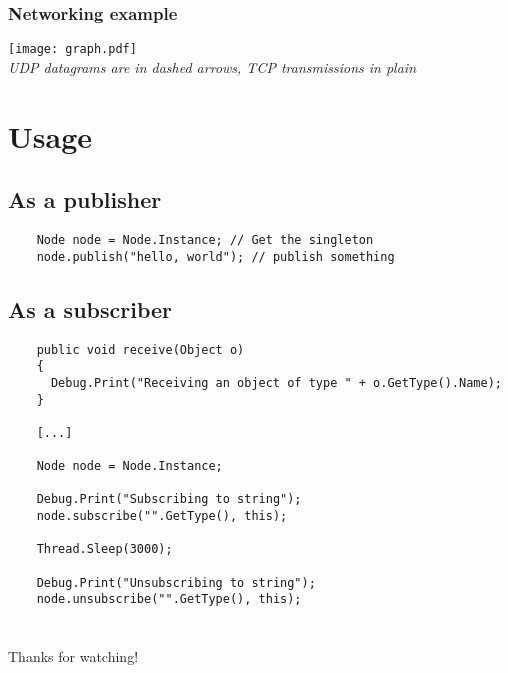 \documentclass{beamer}
\begin{document}
\subsubsection{Networking example}
\begin{frame}
  \begin{center}
    \texttt{[image: graph.pdf]} \\ \vspace{1cm}
    \emph{UDP datagrams are in dashed arrows, TCP transmissions in plain}
  \end{center}
\end{frame}


\section{Usage}
\subsection{As a publisher}
\begin{frame}[fragile]
  \begin{verbatim}
    Node node = Node.Instance; // Get the singleton
    node.publish("hello, world"); // publish something
  \end{verbatim}
\end{frame}

\subsection{As a subscriber}
\begin{frame}[fragile]
  \begin{verbatim}
    public void receive(Object o)
    {
      Debug.Print("Receiving an object of type " + o.GetType().Name);
    }

    [...]

    Node node = Node.Instance;

    Debug.Print("Subscribing to string");
    node.subscribe("".GetType(), this);

    Thread.Sleep(3000);

    Debug.Print("Unsubscribing to string");
    node.unsubscribe("".GetType(), this);
  \end{verbatim}
\end{frame}

\section{}
\begin{frame}
\begin{center}
{\Large Thanks for watching!}
\end{center}
\end{frame}
\end{document}

